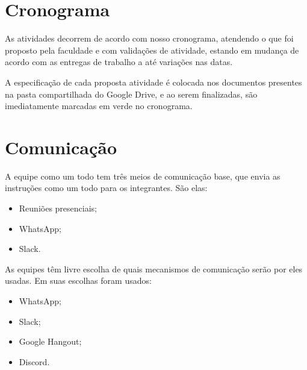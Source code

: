 \section{Cronograma}
\par As atividades decorrem de acordo com nosso cronograma, atendendo o que foi proposto pela faculdade  e com validações de atividade, estando em mudança de acordo com as entregas de trabalho a até variações nas datas.
\par A especificação de cada proposta atividade é colocada nos documentos presentes na pasta compartilhada do Google Drive, e ao serem finalizadas, são imediatamente marcadas em verde no cronograma.
\section{Comunicação}
\par A equipe como um todo tem três meios de comunicação base, que envia as instruções como um todo para os integrantes. São elas:
\begin{itemize}
    \item Reuniões presenciais;
    \item WhatsApp;
    \item Slack.
\end{itemize}
\par As equipes têm livre escolha de quais mecanismos de comunicação serão por eles usadas. Em suas escolhas foram usados:
\begin{itemize}
    \item WhatsApp;
    \item Slack;
    \item Google Hangout;
    \item Discord.
\end{itemize}
